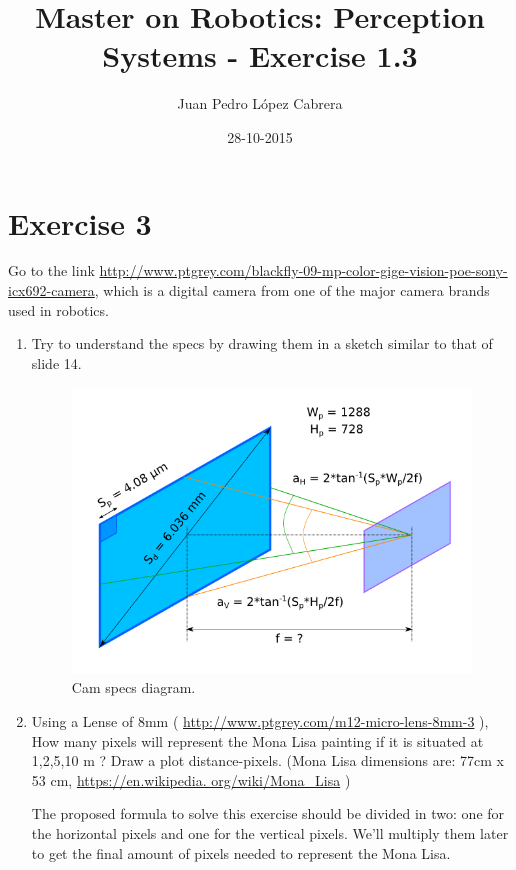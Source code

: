 \documentclass[a4paper]{article}
\title{Master on Robotics: Perception Systems - Exercise 1.3}
\date{28-10-2015}
\author{Juan Pedro López Cabrera}
\begin{document}
  \maketitle

  \newpage

  \section{Exercise 3}
Go to the link \url{http://www.ptgrey.com/blackfly-09-mp-color-gige-vision-poe-sony-icx692-camera}, which is a digital camera from one of
the major camera brands used in robotics.
\begin{enumerate}[label=\alph*.]
    \item Try to understand the specs by drawing them in a sketch similar to that of slide 14.

    \begin{figure}[ht]
      \centering
      \includegraphics[scale=0.5]{Exercise_1_3_a}
      \caption{Cam specs diagram.}
      \label{fig:cam_specs}
    \end{figure}

\item Using a Lense of 8mm ( \url{http://www.ptgrey.com/m12-micro-lens-8mm-3} ), How many pixels will represent the Mona Lisa painting
if it is situated at 1,2,5,10 m ? Draw a plot distance-pixels. (Mona Lisa dimensions are: 77cm x 53 cm, \url{https://en.wikipedia.
org/wiki/Mona_Lisa} )

The proposed formula to solve this exercise should be divided in two: one for the horizontal pixels and one for the vertical pixels. We'll multiply them later to get the final amount of pixels needed to represent the Mona Lisa.


\end{enumerate}
\end{document}
